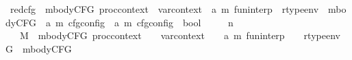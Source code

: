 \begin{isabellebody}
\isadelimdocument
%
\endisadelimdocument
%
\isatagdocument
%
\isamarkuptrue%
%
\endisatagdocument
{\isafolddocument}%
%
\isadelimdocument
%
\endisadelimdocument
{}\isamarkupfalse%
\ red{\isacharunderscore}{\kern0pt}cfg\ {\isacharcolon}{\kern0pt}{\isacharcolon}{\kern0pt}\ {\isachardoublequoteopen}mbodyCFG\ proc{\isacharunderscore}{\kern0pt}context\ {\isasymRightarrow}\ var{\isacharunderscore}{\kern0pt}context\ {\isasymRightarrow}\ {\isacharparenleft}{\kern0pt}{\isacharprime}{\kern0pt}a{\isacharcomma}{\kern0pt}\ {\isacharprime}{\kern0pt}m{\isacharparenright}{\kern0pt}\ fun{\isacharunderscore}{\kern0pt}interp\ {\isasymRightarrow}\ rtype{\isacharunderscore}{\kern0pt}env\ {\isasymRightarrow}\ mbodyCFG\ {\isasymRightarrow}\ {\isacharparenleft}{\kern0pt}{\isacharprime}{\kern0pt}a{\isacharcomma}{\kern0pt}\ {\isacharprime}{\kern0pt}m{\isacharparenright}{\kern0pt}\ cfg{\isacharunderscore}{\kern0pt}config\ {\isasymRightarrow}\ {\isacharparenleft}{\kern0pt}{\isacharprime}{\kern0pt}a{\isacharcomma}{\kern0pt}\ {\isacharprime}{\kern0pt}m{\isacharparenright}{\kern0pt}\ cfg{\isacharunderscore}{\kern0pt}config\ {\isasymRightarrow}\ bool{\isachardoublequoteclose}\isanewline
\ \ {\isacharparenleft}{\kern0pt}{\isachardoublequoteopen}{\isacharunderscore}{\kern0pt}{\isacharcomma}{\kern0pt}{\isacharunderscore}{\kern0pt}{\isacharcomma}{\kern0pt}{\isacharunderscore}{\kern0pt}{\isacharcomma}{\kern0pt}{\isacharunderscore}{\kern0pt}{\isacharcomma}{\kern0pt}{\isacharunderscore}{\kern0pt}\ {\isasymturnstile}\ {\isacharparenleft}{\kern0pt}{\isacharunderscore}{\kern0pt}\ {\isacharminus}{\kern0pt}n{\isasymrightarrow}{\isacharslash}{\kern0pt}\ {\isacharunderscore}{\kern0pt}{\isacharparenright}{\kern0pt}{\isachardoublequoteclose}\ {\isacharbrackleft}{\kern0pt}{}{}{\isacharcomma}{\kern0pt}{}{\isacharcomma}{\kern0pt}{}{\isacharcomma}{\kern0pt}{}{\isacharbrackright}{\kern0pt}\ {}{}{\isacharparenright}{\kern0pt}\isanewline
\ \ \ M\ {\isacharcolon}{\kern0pt}{\isacharcolon}{\kern0pt}\ {\isachardoublequoteopen}mbodyCFG\ proc{\isacharunderscore}{\kern0pt}context{\isachardoublequoteclose}\ \ {\isasymLambda}\ {\isacharcolon}{\kern0pt}{\isacharcolon}{\kern0pt}\ var{\isacharunderscore}{\kern0pt}context\ \ {\isasymGamma}\ {\isacharcolon}{\kern0pt}{\isacharcolon}{\kern0pt}\ {\isachardoublequoteopen}{\isacharparenleft}{\kern0pt}{\isacharprime}{\kern0pt}a{\isacharcomma}{\kern0pt}\ {\isacharprime}{\kern0pt}m{\isacharparenright}{\kern0pt}\ fun{\isacharunderscore}{\kern0pt}interp{\isachardoublequoteclose}\ \ {\isasymOmega}\ {\isacharcolon}{\kern0pt}{\isacharcolon}{\kern0pt}\ rtype{\isacharunderscore}{\kern0pt}env\ \ G\ {\isacharcolon}{\kern0pt}{\isacharcolon}{\kern0pt}\ mbodyCFG\isanewline

\end{isabellebody}
